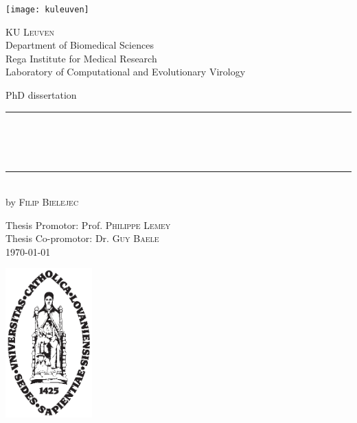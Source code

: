 \begin{titlepage}
	\begin{addmargin}[-1cm]{-3cm}
    \begin{center}
    
    
    \hspace{0.75\textwidth} \texttt{[image: kuleuven]}
    
    
        \large
        {\Large \textsc{KU Leuven}}\\[1ex]
        Department of Biomedical Sciences\\
        Rega Institute for Medical Research\\
        Laboratory of Computational and Evolutionary Virology 

        \vfill

        PhD dissertation\\ \vskip1cm
        \rule{14cm}{0.4pt}\\ \bigskip
        \begingroup
            \Large
            \color{maroon}\spacedallcaps{\myTitle} \\ \bigskip
        \endgroup
        \spacedlowsmallcaps{\mySubtitle} \\ \bigskip
        \rule{14cm}{0.4pt}\\ \vskip1cm
        by \textsc{Filip Bielejec}

        \vfill
        \vfill
        \vfill

        \hfill Thesis Promotor: Prof. \textsc{Philippe Lemey}\\
        \hfill Thesis Co-promotor: Dr. \textsc{Guy Baele}\\
        \hfill \today
    \end{center}
    \vspace{-3.5cm}\includegraphics[width=0.25\textwidth]{figures/sedes}
  \end{addmargin}
\end{titlepage}
